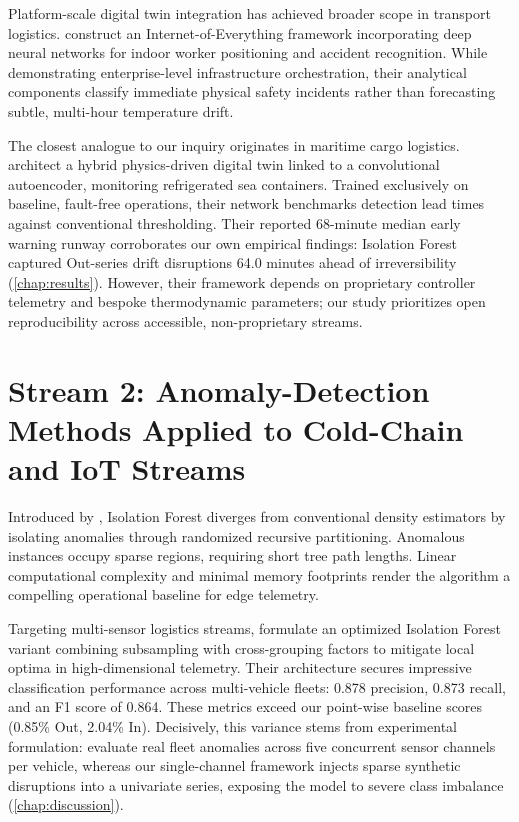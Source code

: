 \documentclass[11pt,a4paper,oneside]{report}
\begin{document}
Platform-scale digital twin integration has achieved broader scope in transport logistics. \textcite{wu2023internet} construct an Internet-of-Everything framework incorporating deep neural networks for indoor worker positioning and accident recognition. While demonstrating enterprise-level infrastructure orchestration, their analytical components classify immediate physical safety incidents rather than forecasting subtle, multi-hour temperature drift.

The closest analogue to our inquiry originates in maritime cargo logistics. \textcite{vuksic2026early} architect a hybrid physics-driven digital twin linked to a convolutional autoencoder, monitoring refrigerated sea containers. Trained exclusively on baseline, fault-free operations, their network benchmarks detection lead times against conventional thresholding. Their reported 68-minute median early warning runway corroborates our own empirical findings: Isolation Forest captured Out-series drift disruptions 64.0 minutes ahead of irreversibility (\cref{chap:results}). However, their framework depends on proprietary controller telemetry and bespoke thermodynamic parameters; our study prioritizes open reproducibility across accessible, non-proprietary streams.

\section{Stream 2: Anomaly-Detection Methods Applied to Cold-Chain and IoT Streams}
\label{sec:lit_stream2}

Introduced by \textcite{liu2008isolation}, Isolation Forest diverges from conventional density estimators by isolating anomalies through randomized recursive partitioning. Anomalous instances occupy sparse regions, requiring short tree path lengths. Linear computational complexity and minimal memory footprints render the algorithm a compelling operational baseline for edge telemetry.

Targeting multi-sensor logistics streams, \textcite{xie2025anomaly} formulate an optimized Isolation Forest variant combining subsampling with cross-grouping factors to mitigate local optima in high-dimensional telemetry. Their architecture secures impressive classification performance across multi-vehicle fleets: 0.878 precision, 0.873 recall, and an F1 score of 0.864. These metrics exceed our point-wise baseline scores (0.85\% Out, 2.04\% In). Decisively, this variance stems from experimental formulation: \textcite{xie2025anomaly} evaluate real fleet anomalies across five concurrent sensor channels per vehicle, whereas our single-channel framework injects sparse synthetic disruptions into a univariate series, exposing the model to severe class imbalance (\cref{chap:discussion}).
\end{document}
